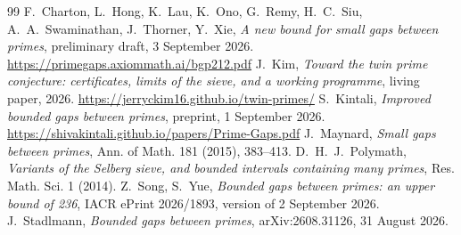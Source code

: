 \begin{thebibliography}{99}
 F.~Charton, L.~Hong, K.~Lau, K.~Ono, G.~Remy, H.~C.~Siu,
A.~A.~Swaminathan, J.~Thorner, Y.~Xie, \emph{A new bound for small gaps
between primes}, preliminary draft, 3 September 2026.
\url{https://primegaps.axiommath.ai/bgp212.pdf}
 J.~Kim, \emph{Toward the twin prime conjecture: certificates,
limits of the sieve, and a working programme}, living paper, 2026.
\url{https://jerryckim16.github.io/twin-primes/}
 S.~Kintali, \emph{Improved bounded gaps between primes},
preprint, 1 September 2026.
\url{https://shivakintali.github.io/papers/Prime-Gaps.pdf}
 J.~Maynard, \emph{Small gaps between primes}, Ann. of Math.
181 (2015), 383--413.
 D.~H.~J.~Polymath, \emph{Variants of the Selberg sieve, and
bounded intervals containing many primes}, Res. Math. Sci. 1 (2014).
 Z.~Song, S.~Yue, \emph{Bounded gaps between primes: an upper
bound of 236}, IACR ePrint 2026/1893, version of 2 September 2026.
 J.~Stadlmann, \emph{Bounded gaps between primes},
arXiv:2608.31126, 31 August 2026.
\end{thebibliography}

